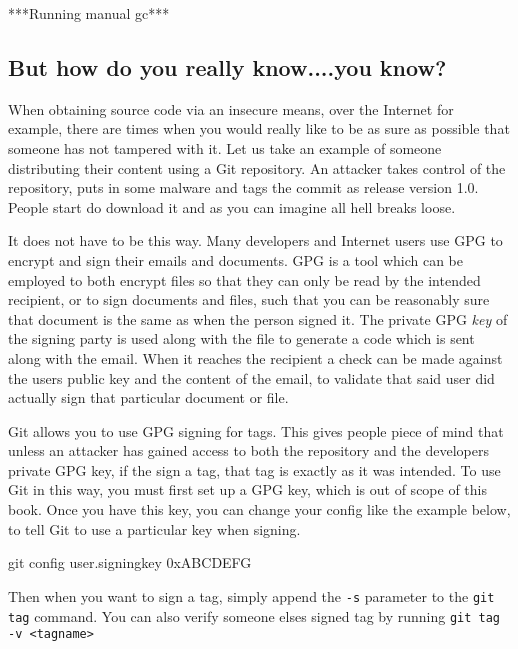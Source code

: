 ***Running manual gc***

\subsection{But how do you really know....you know?}
When obtaining source code via an insecure means, over the Internet for example,
there are times when you would really like to be as sure as possible that someone has not tampered with it.
Let us take an example of someone distributing their content using a Git repository.
An attacker takes control of the repository, puts in some malware and tags the commit as release version 1.0.
People start do download it and as you can imagine all hell breaks loose.

It does not have to be this way.
Many developers and Internet users use GPG to encrypt and sign their emails and documents.
GPG is a tool which can be employed to both encrypt files so that they can only be read by the intended recipient, or to sign documents and files, such that you can be reasonably sure that document is the same as when the person signed it.
The private GPG \emph{key} of the signing party is used along with the file to generate a code which is sent along with the email.
When it reaches the recipient a check can be made against the users public key and the content of the email, to validate that said user did actually sign that particular document or file.

Git allows you to use GPG signing for tags.
This gives people piece of mind that unless an attacker has gained access to both the repository and the developers private GPG key, if the sign a tag, that tag is exactly as it was intended.
To use Git in this way, you must first set up a GPG key, which is out of scope of this book.
Once you have this key, you can change your config like the example below, to tell Git to use a particular key when signing.

\begin{code}
git config user.signingkey 0xABCDEFG
\end{code}

Then when you want to sign a tag, simply append the \texttt{-s} parameter to the \texttt{git tag} command.
You can also verify someone elses signed tag by running \texttt{git tag -v <tagname>}
